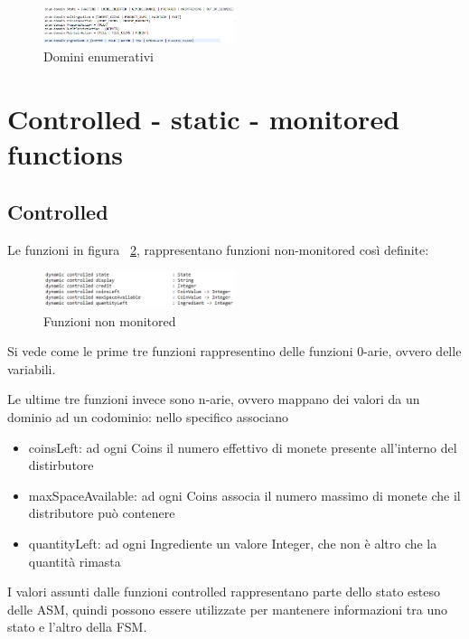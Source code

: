\begin{figure}[h]
	\centering
	\includegraphics[width=0.5\textwidth]{Immagini/EnumDomain.png}
	\caption{Domini enumerativi}
	\label{fig:enumDomain}
\end{figure}

\section{Controlled - static - monitored functions}
\subsection{Controlled}
Le funzioni in figura ~\ref{fig:notMonitored}, rappresentano funzioni non-monitored così definite:
\begin{figure}[h]
	\centering
	\includegraphics[width=0.5\textwidth]{Immagini/DynamicController.png}
	\caption{Funzioni non monitored}
	\label{fig:notMonitored}
\end{figure}

Si vede come le prime tre funzioni rappresentino delle funzioni 0-arie, ovvero delle variabili.

Le ultime tre funzioni invece sono n-arie, ovvero mappano dei valori da un dominio ad un codominio: nello specifico associano
\begin{itemize}
	\item coinsLeft: ad ogni Coins il numero effettivo di monete presente all'interno del distirbutore
	\item maxSpaceAvailable: ad ogni Coins associa il numero massimo di monete che il distributore può contenere
	\item quantityLeft: ad ogni Ingrediente un valore Integer, che non è altro che la quantità rimasta
\end{itemize}

I valori assunti dalle funzioni controlled rappresentano parte dello stato esteso delle ASM, quindi possono essere utilizzate per mantenere informazioni tra uno stato e l’altro della FSM.

